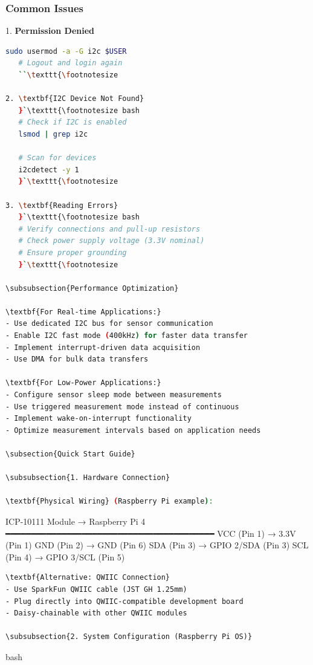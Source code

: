 \documentclass[11pt,a4paper]{article}
\begin{document}
\subsubsection{Common Issues}

1. \textbf{Permission Denied}
   \begin{lstlisting}[language=bash]
sudo usermod -a -G i2c $USER
   # Logout and login again
   ``\texttt{\footnotesize 

2. \textbf{I2C Device Not Found}
   }`\texttt{\footnotesize bash
   # Check if I2C is enabled
   lsmod | grep i2c
   
   # Scan for devices
   i2cdetect -y 1
   }`\texttt{\footnotesize 

3. \textbf{Reading Errors}
   }`\texttt{\footnotesize bash
   # Verify connections and pull-up resistors
   # Check power supply voltage (3.3V nominal)
   # Ensure proper grounding
   }`\texttt{\footnotesize 

\subsubsection{Performance Optimization}

\textbf{For Real-time Applications:}
- Use dedicated I2C bus for sensor communication
- Enable I2C fast mode (400kHz) for faster data transfer
- Implement interrupt-driven data acquisition
- Use DMA for bulk data transfers

\textbf{For Low-Power Applications:}
- Configure sensor sleep mode between measurements
- Use triggered measurement mode instead of continuous
- Implement wake-on-interrupt functionality
- Optimize measurement intervals based on application needs

\subsection{Quick Start Guide}

\subsubsection{1. Hardware Connection}

\textbf{Physical Wiring} (Raspberry Pi example):
\end{lstlisting}
ICP-10111 Module    →    Raspberry Pi 4
━━━━━━━━━━━━━━━━━━━━━━━━━━━━━━━━━━━━━━━━━
VCC (Pin 1)         →    3.3V (Pin 1)
GND (Pin 2)         →    GND (Pin 6) 
SDA (Pin 3)         →    GPIO 2/SDA (Pin 3)
SCL (Pin 4)         →    GPIO 3/SCL (Pin 5)
\begin{lstlisting}[language=text]
\textbf{Alternative: QWIIC Connection}
- Use SparkFun QWIIC cable (JST GH 1.25mm)
- Plug directly into QWIIC-compatible development board
- Daisy-chainable with other QWIIC modules

\subsubsection{2. System Configuration (Raspberry Pi OS)}
\end{lstlisting}bash
\end{document}
